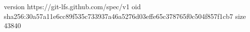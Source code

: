 version https://git-lfs.github.com/spec/v1
oid sha256:30a57a11e6cc89f535c733937a46a5276d03effe65c378765f0c504f857f1cb7
size 43840
